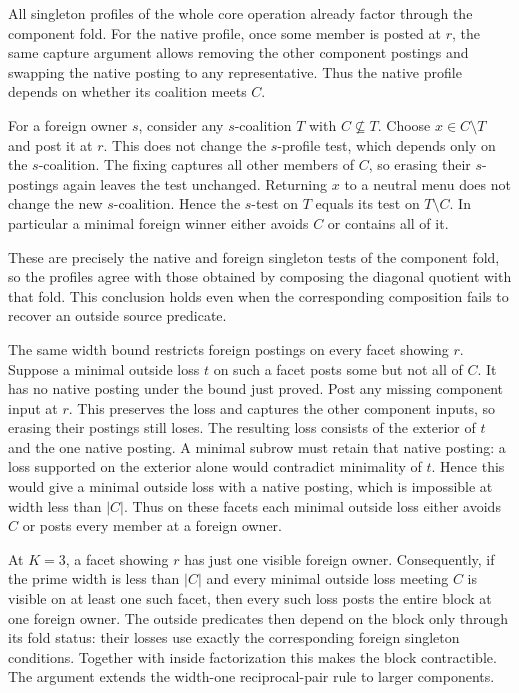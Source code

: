 All singleton profiles of the whole core operation
already factor through the component fold. For the
native profile, once some member is posted at $r$,
the same capture argument allows removing the other
component postings and swapping the native posting
to any representative. Thus the native profile
depends on whether its coalition meets $C$.

For a foreign owner $s$, consider any $s$-coalition
$T$ with $C\not\subseteq T$. Choose $x\in C\setminus T$
and post it at $r$. This does not change the
$s$-profile test, which depends only on the
$s$-coalition. The fixing captures all other members
of $C$, so erasing their $s$-postings again leaves
the test unchanged. Returning $x$ to a neutral menu
does not change the new $s$-coalition. Hence the
$s$-test on $T$ equals its test on $T\setminus C$.
In particular a minimal foreign winner either
avoids $C$ or contains all of it.

These are precisely the native and foreign singleton
tests of the component fold, so the profiles agree
with those obtained by composing the diagonal
quotient with that fold. This conclusion holds even
when the corresponding composition fails to recover
an outside source predicate.

The same width bound restricts foreign postings on
every facet showing $r$. Suppose a minimal outside
loss $t$ on such a facet posts some but not all of
$C$. It has no native posting under the bound just
proved. Post any missing component input at $r$.
This preserves the loss and captures the other
component inputs, so erasing their postings still
loses. The resulting loss consists of the exterior
of $t$ and the one native posting. A minimal
subrow must retain that native posting: a loss
supported on the exterior alone would contradict
minimality of $t$. Hence this would give a minimal
outside loss with a native posting, which is
impossible at width less than $|C|$. Thus on these
facets each minimal outside loss either avoids $C$
or posts every member at a foreign owner.

At $K=3$, a facet showing $r$ has just one visible
foreign owner. Consequently, if the prime width is
less than $|C|$ and every minimal outside loss
meeting $C$ is visible on at least one such facet,
then every such loss posts the entire block at one
foreign owner. The outside predicates then depend on
the block only through its fold status: their losses
use exactly the corresponding foreign singleton
conditions. Together with inside factorization this
makes the block contractible. The argument extends
the width-one reciprocal-pair rule to larger
components.

